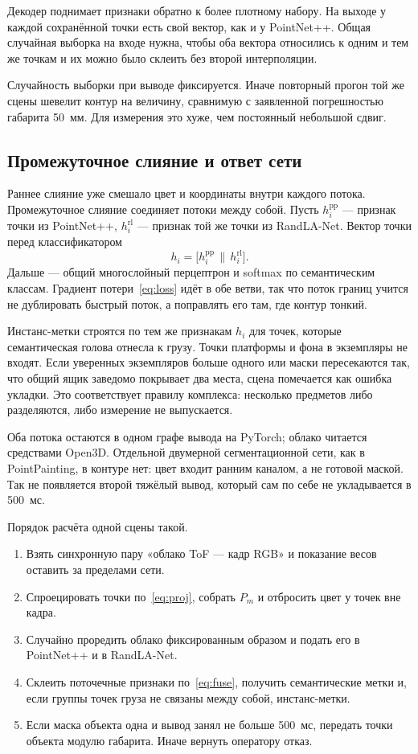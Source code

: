 \documentclass{misisarticle}
\begin{document}
Декодер поднимает признаки обратно к более плотному набору. На выходе у каждой сохранённой точки есть свой вектор, как и у PointNet++. Общая случайная выборка на входе нужна, чтобы оба вектора относились к одним и тем же точкам и их можно было склеить без второй интерполяции.

Случайность выборки при выводе фиксируется. Иначе повторный прогон той же сцены шевелит контур на величину, сравнимую с заявленной погрешностью габарита 50~мм. Для измерения это хуже, чем постоянный небольшой сдвиг.

\subsection{Промежуточное слияние и ответ сети}

Раннее слияние уже смешало цвет и координаты внутри каждого потока. Промежуточное слияние соединяет потоки между собой. Пусть $h^{\mathrm{pp}}_i$ --- признак точки из PointNet++, $h^{\mathrm{rl}}_i$ --- признак той же точки из RandLA-Net. Вектор точки перед классификатором
\begin{equation}
h_i = \bigl[h^{\mathrm{pp}}_i \,\|\, h^{\mathrm{rl}}_i\bigr].
\label{eq:fuse}
\end{equation}
Дальше --- общий многослойный перцептрон и softmax по семантическим классам. Градиент потери~\eqref{eq:loss} идёт в обе ветви, так что поток границ учится не дублировать быстрый поток, а поправлять его там, где контур тонкий.

Инстанс-метки строятся по тем же признакам $h_i$ для точек, которые семантическая голова отнесла к грузу. Точки платформы и фона в экземпляры не входят. Если уверенных экземпляров больше одного или маски пересекаются так, что общий ящик заведомо покрывает два места, сцена помечается как ошибка укладки. Это соответствует правилу комплекса: несколько предметов либо разделяются, либо измерение не выпускается.

Оба потока остаются в одном графе вывода на PyTorch; облако читается средствами Open3D. Отдельной двумерной сегментационной сети, как в PointPainting, в контуре нет: цвет входит ранним каналом, а не готовой маской. Так не появляется второй тяжёлый вывод, который сам по себе не укладывается в 500~мс.

Порядок расчёта одной сцены такой.

\begin{enumerate}
\item Взять синхронную пару «облако ToF --- кадр RGB» и показание весов оставить за пределами сети.
\item Спроецировать точки по~\eqref{eq:proj}, собрать $P_m$ и отбросить цвет у точек вне кадра.
\item Случайно проредить облако фиксированным образом и подать его в PointNet++ и в RandLA-Net.
\item Склеить поточечные признаки по~\eqref{eq:fuse}, получить семантические метки и, если группы точек груза не связаны между собой, инстанс-метки.
\item Если маска объекта одна и вывод занял не больше 500~мс, передать точки объекта модулю габарита. Иначе вернуть оператору отказ.
\end{enumerate}
\end{document}
